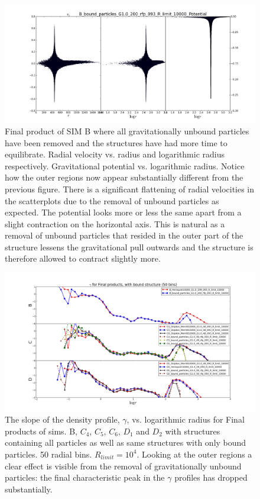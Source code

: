 \begin{figure}
\centering
\includegraphics[width=1.0\linewidth]{img/B_rfp_vr_V_panel.png}
\caption{Final product of SIM B where all gravitationally unbound particles have been removed and the structures have had more time to equilibrate. Radial velocity vs. radius and logarithmic radius respectively. Gravitational potential vs. logarithmic radius. Notice how the outer regions now appear substantially different from the previous figure. There is a significant flattening of radial velocities in the scatterplots due to the removal of unbound particles as expected. The potential looks more or less the same apart from a slight contraction on the horizontal axis. This is natural as a removal of unbound particles that resided in the outer part of the structure lessens the gravitational pull outwards and the structure is therefore allowed to contract slightly more.}
\label{fig:test}
\end{figure}
\newpage

\begin{figure}
\centering
\includegraphics[width=1.0\linewidth]{img/BC4C5C6D1D2rfp_gamma_logr_panel.png}
\caption{The slope of the density profile, $\gamma$, vs. logarithmic radius for Final products of sims. B, $C_4$, $C_5$, $C_6$, $D_1$ and $D_2$ with structures containing all particles as well as same structures with only bound particles. 50 radial bins. $R_{limit} = 10^4$. Looking at the outer regions a clear effect is visible from the removal of gravitationally unbound particles: the final characteristic peak in the $\gamma$ profiles has dropped substantially.}
\label{fig:test}
\end{figure}

